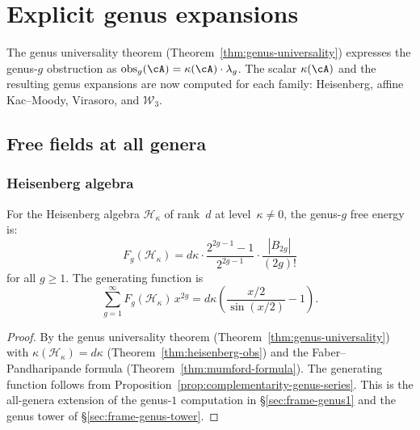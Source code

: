 \chapter{Explicit genus expansions}\label{ch:genus-expansions}


The genus universality theorem
(Theorem~\ref{thm:genus-universality}) expresses the genus-$g$
obstruction as $\mathrm{obs}_g(\cA) = \kappa(\cA) \cdot \lambda_g$.
The scalar $\kappa(\cA)$ and the resulting genus expansions are now
computed for each family: Heisenberg, affine Kac--Moody, Virasoro,
and $\mathcal{W}_3$.

\section{Free fields at all genera}\label{sec:free-field-genera}

\subsection{Heisenberg algebra}\label{subsec:heisenberg-all-genera}

\begin{theorem}\label{thm:heisenberg-all-genera}
For the Heisenberg algebra $\mathcal{H}_\kappa$
of rank~$d$ at level~$\kappa \neq 0$, the genus-$g$
free energy is:
\begin{equation}\label{eq:heisenberg-Fg}
F_g(\mathcal{H}_\kappa) = d\kappa \cdot
\frac{2^{2g-1}-1}{2^{2g-1}} \cdot
\frac{|B_{2g}|}{(2g)!}
\end{equation}
for all $g \geq 1$.  The generating function is
\begin{equation}\label{eq:heisenberg-generating}
\sum_{g=1}^{\infty} F_g(\mathcal{H}_\kappa)\, x^{2g}
= d\kappa \left(\frac{x/2}{\sin(x/2)} - 1\right).
\end{equation}
\end{theorem}

\begin{proof}
By the genus universality theorem
(Theorem~\ref{thm:genus-universality}) with
$\kappa(\mathcal{H}_\kappa) = d\kappa$
(Theorem~\ref{thm:heisenberg-obs}) and
the Faber--Pandharipande formula
(Theorem~\ref{thm:mumford-formula}).
The generating function follows from
Proposition~\ref{prop:complementarity-genus-series}.
This is the all-genera extension of the genus-$1$ computation in
\S\ref{sec:frame-genus1} and the genus tower of \S\ref{sec:frame-genus-tower}.
\end{proof}

